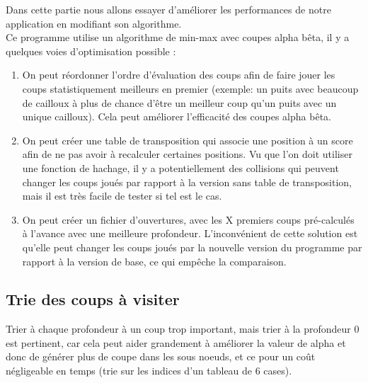 \documentclass[
 aip,
 jmp,
 amsmath,amssymb,
 reprint
]{revtex4-1}
\begin{document}
Dans cette partie nous allons essayer d'améliorer les performances de notre application en modifiant son algorithme.\\
Ce programme utilise un algorithme de min-max avec coupes alpha bêta, il y a quelques voies d'optimisation possible :
\begin{enumerate}
\item On peut réordonner l'ordre d'évaluation des coups afin de faire jouer les coups statistiquement meilleurs en premier (exemple: un puits avec beaucoup de cailloux à plus de chance d'être un meilleur coup qu'un puits avec un unique cailloux). Cela peut améliorer l'efficacité des coupes alpha bêta.
\item On peut créer une table de transposition qui associe une position à un score afin de ne pas avoir à recalculer certaines positions. Vu que l'on doit utiliser une fonction de hachage, il y a potentiellement des collisions qui peuvent changer les coups joués par rapport à la version sans table de transposition, mais il est très facile de tester si tel est le cas.
\item On peut créer un fichier d'ouvertures, avec les X premiers coups pré-calculés à l'avance avec une meilleure profondeur. L'inconvénient de cette solution est qu'elle peut changer les coups joués par la nouvelle version du programme par rapport à la version de base, ce qui empêche la comparaison.
\end{enumerate}

\subsection{Trie des coups à visiter}
Trier à chaque profondeur à un coup trop important, mais trier à la profondeur 0 est pertinent, car cela peut aider grandement à améliorer la valeur de alpha et donc de générer plus de coupe dans les sous noeuds, et ce pour un coût négligeable en temps (trie sur les indices d'un tableau de 6 cases).
\end{document}
